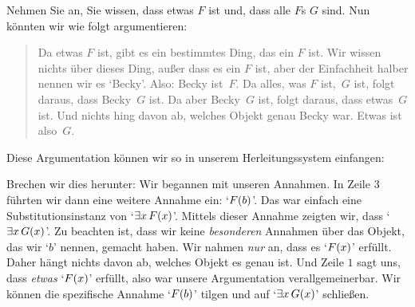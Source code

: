 Nehmen Sie an, Sie wissen, dass etwas $F$ ist und, dass alle $F$s $G$ sind. Nun könnten wir wie folgt argumentieren:
	\begin{quote}
		Da etwas $F$ ist, gibt es ein bestimmtes Ding, das ein $F$ ist. Wir wissen nichts über dieses Ding, au{\ss}er dass es ein $F$ ist, aber der Einfachheit halber nennen wir es `Becky'. Also: Becky ist~$F$. Da alles, was $F$ ist,~$G$ ist, folgt daraus, dass Becky~$G$ ist. Da aber Becky~$G$ ist, folgt daraus, dass etwas~$G$ ist. Und nichts hing davon ab, welches Objekt genau Becky war. Etwas ist also~$G$.
	\end{quote}
Diese Argumentation können wir so in unserem Herleitungssystem einfangen:
\begin{fitchproof}
	\open
		 
	\close
\end{fitchproof}\noindent
Brechen wir dies herunter: Wir begannen mit unseren Annahmen. In Zeile $3$ führten wir dann eine weitere Annahme ein: `$\mathord{F}(b)$'. Das war einfach eine Substitutionsinstanz von `$\exists x\,\mathord{F}(x)$'. Mittels dieser Annahme zeigten wir, dass `$\exists x\,\mathord{G}(x)$'. Zu beachten ist, dass wir keine  \emph{besonderen} Annahmen über das Objekt, das wir `$b$' nennen, gemacht haben. Wir nahmen \emph{nur} an, dass es `$\mathord{F}(x)$' erfüllt. Daher hängt nichts davon ab, welches Objekt es genau ist. Und Zeile $1$ sagt uns, dass \emph{etwas} `$\mathord{F}(x)$' erfüllt, also war unsere Argumentation verallgemeinerbar. Wir können die spezifische Annahme `$\mathord{F}(b)$' tilgen und auf `$\exists x\,\mathord{G}(x)$' schlie{\ss}en.


